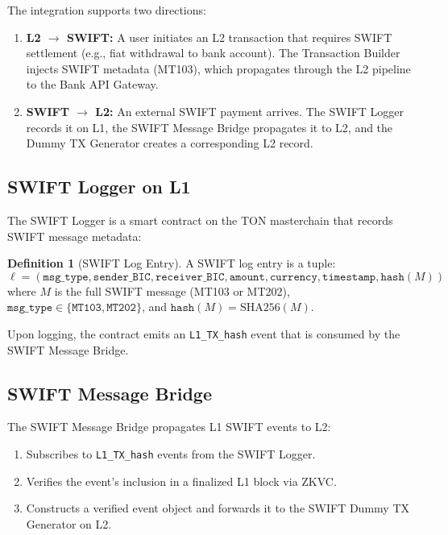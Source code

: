 \documentclass[12pt,a4paper]{article}
\theoremstyle{definition}
\newtheorem{definition}{Definition}[section]
\theoremstyle{remark}
\begin{document}
The integration supports two directions:
\begin{enumerate}[nosep]
    \item \textbf{L2 $\to$ SWIFT:} A user initiates an L2 transaction that requires SWIFT settlement (e.g., fiat withdrawal to bank account). The Transaction Builder injects SWIFT metadata (MT103), which propagates through the L2 pipeline to the Bank API Gateway.
    \item \textbf{SWIFT $\to$ L2:} An external SWIFT payment arrives. The SWIFT Logger records it on L1, the SWIFT Message Bridge propagates it to L2, and the Dummy TX Generator creates a corresponding L2 record.
\end{enumerate}

\subsection{SWIFT Logger on L1}

The SWIFT Logger is a smart contract on the TON masterchain that records SWIFT message metadata:

\begin{definition}[SWIFT Log Entry]
A SWIFT log entry is a tuple:
\begin{equation}
\ell = (\texttt{msg\_type}, \texttt{sender\_BIC}, \texttt{receiver\_BIC}, \texttt{amount}, \texttt{currency}, \texttt{timestamp}, \texttt{hash}(M))
\end{equation}
where $M$ is the full SWIFT message (MT103 or MT202), $\texttt{msg\_type} \in \{\texttt{MT103}, \texttt{MT202}\}$, and $\texttt{hash}(M) = \text{SHA256}(M)$.
\end{definition}

Upon logging, the contract emits an \texttt{L1\_TX\_hash} event that is consumed by the SWIFT Message Bridge.

\subsection{SWIFT Message Bridge}

The SWIFT Message Bridge propagates L1 SWIFT events to L2:

\begin{enumerate}[nosep]
    \item Subscribes to \texttt{L1\_TX\_hash} events from the SWIFT Logger.
    \item Verifies the event's inclusion in a finalized L1 block via ZKVC.
    \item Constructs a verified event object and forwards it to the SWIFT Dummy TX Generator on L2.
\end{enumerate}
\end{document}
